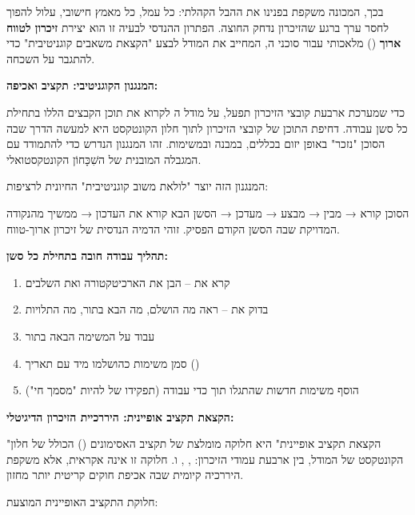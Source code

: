 בכך, המכונה משקפת בפנינו את ההבל הקהלתי: כל עמל, כל מאמץ חישובי, עלול להפוך לחסר ערך ברגע שהזיכרון נדחק החוצה. הפתרון ההנדסי לבעיה זו הוא יצירת \textbf{זיכרון לטווח ארוך} () מלאכותי עבור סוכני ה, המחייב את המודל לבצע "הקצאת משאבים קוגניטיבית" כדי להתגבר על השכחה.

\textbf{המנגנון הקוגניטיבי: תקציב  ואכיפה:}

כדי שמערכת ארבעת קובצי הזיכרון תפעל, על מודל ה לקרוא את תוכן הקבצים הללו בתחילת כל סשן עבודה. דחיפת התוכן של קובצי הזיכרון לתוך חלון הקונטקסט היא למעשה הדרך שבה הסוכן "נזכר" באופן יזום בכללים, במבנה ובמשימות. זהו המנגנון הנדרש כדי להתמודד עם המגבלה המובנית של השִׁכָּחוֹן הקונטקסטואלי.

המנגנון הזה יוצר "לולאת משוב קוגניטיבית" החיונית לרציפות:

הסוכן קורא → מבין → מבצע → מעדכן → הסשן הבא קורא את העדכון → ממשיך מהנקודה המדויקת שבה הסשן הקודם הפסיק. זוהי הדמיה הנדסית של זיכרון ארוך-טווח.

\textbf{תהליך עבודה חובה בתחילת כל סשן:}
\begin{enumerate}
  \item קרא את  – הבן את הארכיטקטורה ואת השלבים
  \item בדוק את  – ראה מה הושלם, מה הבא בתור, מה התלויות
  \item עבוד על המשימה הבאה בתור
  \item סמן משימות כהושלמו מיד עם תאריך ()
  \item הוסף משימות חדשות שהתגלו תוך כדי עבודה (תפקידו של  להיות "מסמך חי")
\end{enumerate}

\textbf{הקצאת תקציב  אופיינית: היררכיית הזיכרון הדיגיטלי:}

"הקצאת תקציב  אופיינית" היא חלוקה מומלצת של תקציב האסימונים () הכולל של חלון הקונטקסט של המודל, בין ארבעת עמודי הזיכרון: , ,  ו. חלוקה זו אינה אקראית, אלא משקפת היררכיה קיומית שבה אכיפת חוקים קריטית יותר מחזון.

חלוקת התקציב האופיינית המוצעת:

